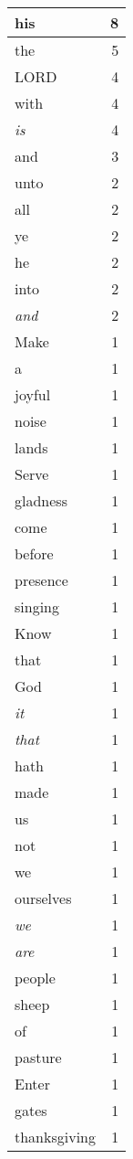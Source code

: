 \begin{center}
\begin{longtable}{l|r}
\hline \hline
\endlastfoot
his & 8 \\ \hline
the & 5 \\ \hline
LORD & 4 \\ \hline
with & 4 \\ \hline
\emph{is} & 4 \\ \hline
and & 3 \\ \hline
unto & 2 \\ \hline
all & 2 \\ \hline
ye & 2 \\ \hline
he & 2 \\ \hline
into & 2 \\ \hline
\emph{and} & 2 \\ \hline
Make & 1 \\ \hline
a & 1 \\ \hline
joyful & 1 \\ \hline
noise & 1 \\ \hline
lands & 1 \\ \hline
Serve & 1 \\ \hline
gladness & 1 \\ \hline
come & 1 \\ \hline
before & 1 \\ \hline
presence & 1 \\ \hline
singing & 1 \\ \hline
Know & 1 \\ \hline
that & 1 \\ \hline
God & 1 \\ \hline
\emph{it} & 1 \\ \hline
\emph{that} & 1 \\ \hline
hath & 1 \\ \hline
made & 1 \\ \hline
us & 1 \\ \hline
not & 1 \\ \hline
we & 1 \\ \hline
ourselves & 1 \\ \hline
\emph{we} & 1 \\ \hline
\emph{are} & 1 \\ \hline
people & 1 \\ \hline
sheep & 1 \\ \hline
of & 1 \\ \hline
pasture & 1 \\ \hline
Enter & 1 \\ \hline
gates & 1 \\ \hline
thanksgiving & 1 \\ \hline

\end{longtable}
\end{center}
